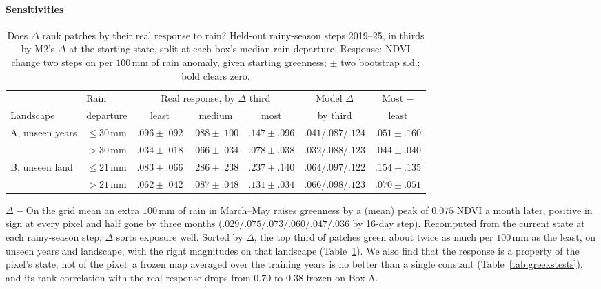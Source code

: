 \documentclass{article}
\begin{document}
\paragraph{Sensitivities} 
\begin{table}[t]\centering\footnotesize\setlength{\tabcolsep}{3pt}
\caption{Does $\Delta$ rank patches by their real response to rain? Held-out rainy-season steps 2019--25, in thirds by M2's $\Delta$ at the starting state, split at each box's median rain departure. Response: NDVI change two steps on per $100$\,mm of rain anomaly, given starting greenness; $\pm$ two bootstrap s.d.; bold clears zero.}\label{tab:greeks}
\begin{tabular}{llccccc}\toprule
 & Rain & \multicolumn{3}{c}{Real response, by $\Delta$ third} & Model $\Delta$ & Most $-$\\
Landscape & departure & least & medium & most & by third & least\\\midrule
A, unseen years & $\le 30$\,mm & $.096\pm.092$ & $.088\pm.100$ & $.147\pm.096$ & $.041/.087/.124$ & $.051\pm.160$\\
 & $> 30$\,mm & $.034\pm.018$ & $.066\pm.034$ & $.078\pm.038$ & $.032/.088/.123$ & $\mathbf{.044\pm.040}$\\
B, unseen land & $\le 21$\,mm & $.083\pm.066$ & $.286\pm.238$ & $.237\pm.140$ & $.064/.097/.122$ & $\mathbf{.154\pm.135}$\\
 & $> 21$\,mm & $.062\pm.042$ & $.087\pm.048$ & $.131\pm.034$ & $.066/.098/.123$ & $\mathbf{.070\pm.051}$\\\bottomrule
\end{tabular}
\end{table}


\textbf{$\Delta$ -- } On the grid mean an extra $100$\,mm of rain in March--May raises greenness by a (mean) peak of $0.075$ NDVI a month later, positive in sign at every pixel and half gone by three months ($.029/.075/.073/.060/.047/.036$ by 16-day step). Recomputed from the current state at each rainy-season step, $\Delta$ sorts exposure well. Sorted by $\Delta$, the top third of patches green about twice as much per $100$\,mm as the least, on unseen years and landscape, with the right magnitudes on that landscape (Table~\ref{tab:greeks}). We also find that the response is a property of the pixel's state, not of the pixel: a frozen map averaged over the training years is no better than a single constant (Table~\ref{tab:greekstests}), and its rank correlation with the real response drops from $0.70$ to $0.38$ frozen on Box A.
\end{document}
